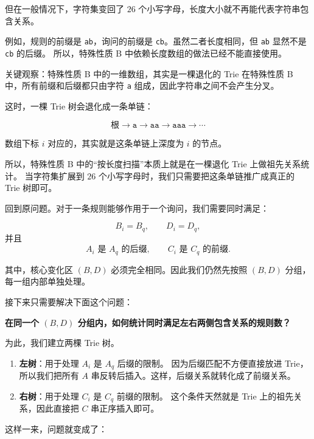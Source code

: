 \documentclass{book}
\newcommand{\code}[1]{\colorbox{codebg}{\texttt{#1}}}  %
\begin{document}
但在一般情况下，字符集变回了 $26$ 个小写字母，长度大小就不再能代表字符串包含关系。

例如，规则的前缀是 \code{ab}，询问的前缀是 \code{cb}。虽然二者长度相同，但 \code{ab} 显然不是 \code{cb} 的后缀。  
所以，特殊性质 B 中依赖长度数组的做法已经不能直接使用。

\begin{keybox}{关键观察：特殊性质 B 中的一维数组，其实是一棵退化的 Trie}
在特殊性质 B 中，所有前缀和后缀都只由字符 \code{a} 组成，因此字符串之间不会产生分叉。

这时，一棵 Trie 树会退化成一条单链：

\[
\text{根} \rightarrow \texttt{a} \rightarrow \texttt{aa} \rightarrow \texttt{aaa} \rightarrow \cdots
\]

数组下标 $i$ 对应的，其实就是这条单链上深度为 $i$ 的节点。

所以，特殊性质 B 中的“按长度扫描”本质上就是在一棵退化 Trie 上做祖先关系统计。  
当字符集扩展到 $26$ 个小写字母时，我们只需要把这条单链推广成真正的 Trie 树即可。
\end{keybox}

回到原问题。对于一条规则能够作用于一个询问，我们需要同时满足：

\[
B_i=B_q,\qquad D_i=D_q,
\]
并且
\[
A_i \text{ 是 } A_q \text{ 的后缀},\qquad
C_i \text{ 是 } C_q \text{ 的前缀}.
\]

其中，核心变化区 $(B,D)$ 必须完全相同。因此我们仍然先按照 $(B,D)$ 分组，每一组内部单独处理。

接下来只需要解决下面这个问题：

\begin{center}
\textbf{在同一个 $(B,D)$ 分组内，如何统计同时满足左右两侧包含关系的规则数？}
\end{center}

为此，我们建立两棵 Trie 树。

\begin{enumerate}[leftmargin=2em,itemsep=2pt,topsep=2pt,parsep=0pt,partopsep=0pt]
    \item \textbf{左树}：用于处理 $A_i$ 是 $A_q$ 后缀的限制。  
    因为后缀匹配不方便直接放进 Trie，所以我们把所有 $A$ 串反转后插入。这样，后缀关系就转化成了前缀关系。

    \item \textbf{右树}：用于处理 $C_i$ 是 $C_q$ 前缀的限制。  
    这个条件天然就是 Trie 上的祖先关系，因此直接把 $C$ 串正序插入即可。
\end{enumerate}

这样一来，问题就变成了：
\end{document}
